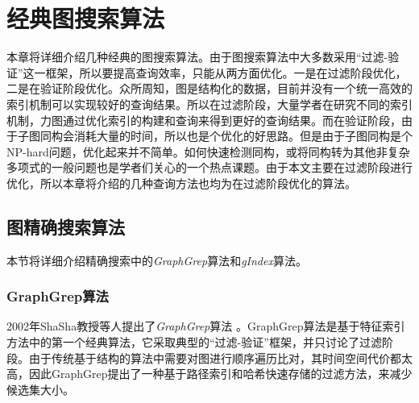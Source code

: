 \documentclass{XDBAthesis}
\begin{document}
\def\pictures{}
\else
\fi
\chapter{经典图搜索算法}
\label{chap:classic}
本章将详细介绍几种经典的图搜索算法。由于图搜索算法中大多数采用“过滤-验证”这一框架，所以要提高查询效率，只能从两方面优化。一是在过滤阶段优化，二是在验证阶段优化。众所周知，图是结构化的数据，目前并没有一个统一高效的索引机制可以实现较好的查询结果。所以在过滤阶段，大量学者在研究不同的索引机制，力图通过优化索引的构建和查询来得到更好的查询结果。而在验证阶段，由于子图同构会消耗大量的时间，所以也是个优化的好思路。但是由于子图同构是个NP-hard问题，优化起来并不简单。如何快速检测同构，或将同构转为其他非复杂多项式的一般问题也是学者们关心的一个热点课题。由于本文主要在过滤阶段进行优化，所以本章将介绍的几种查询方法也均为在过滤阶段优化的算法。
\section{图精确搜索算法}
本节将详细介绍精确搜索中的\emph{GraphGrep}算法\cite{graphgrep}和\emph{gIndex}算法\cite{gIndex}。
\subsection{GraphGrep算法}
2002年ShaSha教授等人提出了\emph{GraphGrep}算法\cite{graphgrep} 。GraphGrep算法是基于特征索引方法中的第一个经典算法，它采取典型的“过滤-验证”框架，并只讨论了过滤阶段。由于传统基于结构的算法中需要对图进行顺序遍历比对，其时间空间代价都太高，因此GraphGrep提出了一种基于路径索引和哈希快速存储的过滤方法，来减少候选集大小。
\end{document}
